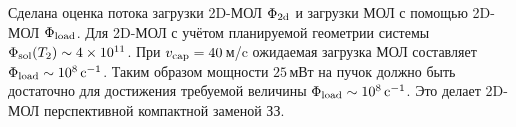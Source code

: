 
Сделана оценка потока загрузки 2D-МОЛ $\Phi_{\textnormal{2d}}$ и загрузки МОЛ с помощью 2D-МОЛ $\Phi_{\textnormal{load}}$. Для 2D-МОЛ с учётом планируемой геометрии системы $\Phi_{\textnormal{sol}}(T_2) \sim 4\times 10^{11}$. При $v_{\textnormal{cap}} = 40\,$м/c ожидаемая загрузка МОЛ составляет $\Phi_{\textnormal{load}} \sim 10^8\,\text{c}^{-1}$. Таким образом мощности $25\,$мВт на пучок должно быть достаточно для достижения требуемой величины $\Phi_{\textnormal{load}} \sim 10^8\,\text{c}^{-1}$. Это делает 2D-МОЛ перспективной компактной заменой ЗЗ.